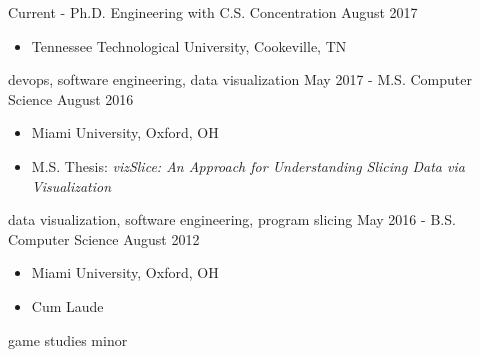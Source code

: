 

\begin{experiences}
  \experience
    {Current -}   {Ph.D. Engineering with C.S. Concentration}{}{}
    {August 2017} {
                    \begin{itemize}
                        \item {Tennessee Technological University, Cookeville, TN}
                    \end{itemize}
                    }
                    {devops, software engineering, data visualization}
  \emptySeparator
    \experience
      {May 2017 -}   {M.S. Computer Science}{ }{ }
    {August 2016} {
                    \begin{itemize}
                        \item {Miami University, Oxford, OH}
                        \item {M.S. Thesis: \textit{vizSlice: An Approach for Understanding Slicing Data via Visualization}}
                    \end{itemize}
                    }
                    {data visualization, software engineering, program slicing}
  \emptySeparator
    \experience
      {May 2016 -}   {B.S. Computer Science}{ }{ }
    {August 2012} {
                    \begin{itemize}
                        \item {Miami University, Oxford, OH}
                        \item {Cum Laude}
                    \end{itemize}
                    }
                    {game studies minor}
\end{experiences}